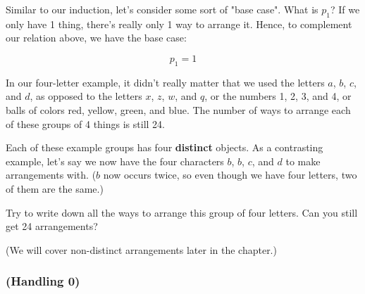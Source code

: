 Similar to our induction, let's consider some sort of "base case". What is $p_1$? If we only have 1 thing, there's really only 1 way to arrange it. Hence, to complement our relation above, we have the base case:

\begin{equation}
p_1 = 1
\end{equation}






\begin{exercise}
In our four-letter example, it didn't really matter that we used the letters $a$, $b$, $c$, and $d$, as opposed to the letters $x$, $z$, $w$, and $q$, or the numbers 1, 2, 3, and 4, or balls of colors red, yellow, green, and blue. The number of ways to arrange each of these groups of 4 things is still 24.

Each of these example groups has four \textbf{distinct} objects. As a contrasting example, let's say we now have the four characters $b$, $b$, $c$, and $d$ to make arrangements with. ($b$ now occurs twice, so even though we have four letters, two of them are the same.)

Try to write down all the ways to arrange this group of four letters. Can you still get 24 arrangements?


(We will cover non-distinct arrangements later in the chapter.)
\end{exercise}

\subsubsection{(Handling 0)}

